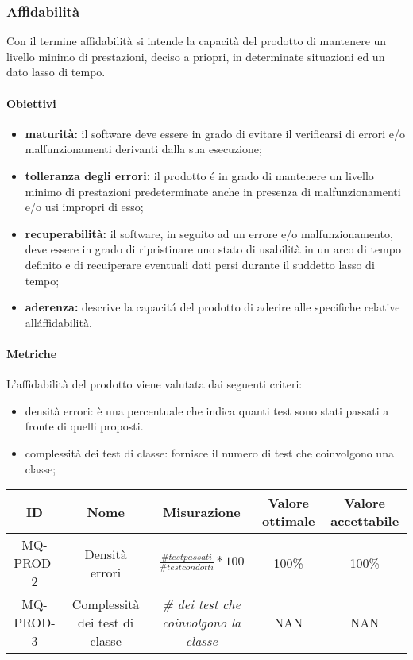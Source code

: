 \subsubsection{Affidabilità}
Con il termine affidabilità si intende la capacità del prodotto di mantenere un livello minimo di prestazioni, deciso a priopri, in determinate situazioni ed un dato lasso di tempo.
	\paragraph{Obiettivi}
		\begin{itemize}
			\item \textbf{maturità:} il software deve essere in grado di evitare il verificarsi di errori e/o malfunzionamenti derivanti dalla sua esecuzione;
			\item \textbf{tolleranza degli errori:} il prodotto é in grado di mantenere un livello minimo di prestazioni predeterminate anche in presenza di malfunzionamenti e/o usi impropri di esso;
			\item \textbf{recuperabilità:} il software, in seguito ad un errore e/o malfunzionamento, deve essere in grado di ripristinare uno stato di usabilità in un arco di tempo definito e di recuiperare eventuali dati persi durante il suddetto lasso di tempo;
			\item \textbf{aderenza:} descrive la capacitá del prodotto di aderire alle specifiche relative alláffidabilità.
		\end{itemize}
	\paragraph{Metriche}
	L'affidabilità del prodotto viene valutata dai seguenti criteri:
	\begin{itemize}
		\item densità errori: è una percentuale che indica quanti test sono stati passati a fronte di quelli proposti.
		\item complessità dei test di classe: fornisce il numero di test che coinvolgono una classe;
	\end{itemize}
	\begin{center}
		\begin{tabular}{|c|c|c|c|c|}
			\hline
			ID & Nome & Misurazione & Valore ottimale & Valore accettabile \\
			\hline
			MQ-PROD-2 & Densità errori & \(\frac{\# test passati}{\# test condotti}*100\) & 100\% & 100\% \\
			\hline
			MQ-PROD-3 & Complessità dei test di classe & \textit{\# dei test che coinvolgono la classe} & NAN & NAN \\
			\hline
		\end{tabular}
	\end{center}
